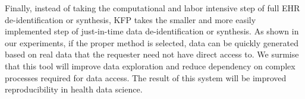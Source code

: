 \documentclass{amia}
\begin{document}
Finally, instead of taking the computational and labor intensive step of full EHR de-identification or synthesis, KFP takes the smaller and more easily implemented step of just-in-time data de-identification or synthesis. As shown in our experiments, if the proper method is selected, data can be quickly generated based on real data that the requester need not have direct access to. We surmise that this tool will improve data exploration and reduce dependency on complex processes required for data access. The result of this system will be improved reproducibility in health data science.




\end{document}
